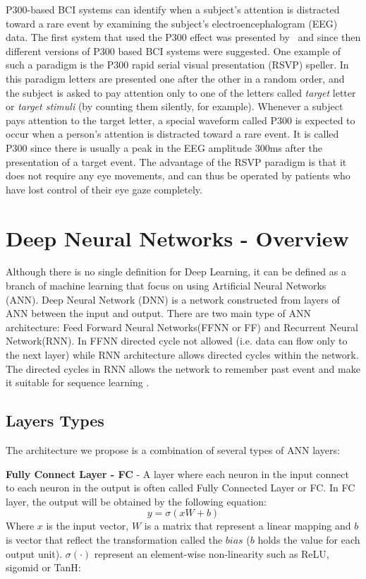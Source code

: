 \documentclass[
12pt, %
english, %
doublespacing, %
headsepline, %
]{MastersDoctoralThesis} %
\begin{document}
P300-based BCI systems can identify when a subject's attention is distracted toward a rare event by examining the subject's electroencephalogram (EEG) data. The first system that used the P300 effect was presented by~\cite{FirstP300} and since then different versions of P300 based BCI systems were suggested. One example of such a paradigm is the P300 rapid serial visual presentation (RSVP) speller. In this paradigm letters are presented one after the other in a random order, and the subject is asked to pay attention only to one of the letters called \textit{target} letter or \textit{target stimuli} (by counting them silently, for example). Whenever a subject pays attention to the target letter, a special waveform called P300 is expected to occur when a person's attention is distracted toward a rare event. It is called P300 since there is usually a peak in the EEG amplitude 300ms after the presentation of a target event. The advantage of the RSVP paradigm is that it does not require any eye movements, and can thus be operated by patients who have lost control of their eye gaze completely.

\section{Deep Neural Networks - Overview}

Although there is no single definition for Deep Learning, it can be defined as a branch of machine learning that focus on using Artificial Neural Networks (ANN). Deep Neural Network (DNN) is a network constructed from layers of ANN between the input and output. There are two main type of ANN architecture: Feed Forward Neural Networks(FFNN or FF) and Recurrent Neural Network(RNN). In FFNN directed cycle not allowed (i.e. data can flow only to the next layer)  while RNN architecture allows directed cycles within the network. The directed cycles in RNN allows the network to remember past event and make it suitable for sequence learning \cite{rumelhart1985learning}.



\subsection{Layers Types}
The architecture we propose is a combination of several types of ANN layers:

\textbf{Fully Connect Layer - FC} - A layer where each neuron in the input connect to each neuron in the output is often called Fully Connected Layer or FC. In FC layer, the output will be obtained by the following equation:
\[y=\sigma \left( {xW + b} \right)\]
Where $x$ is the input vector, $W$ is a matrix that represent a linear mapping and $b$ is vector that reflect the transformation called the $bias$ ($b$ holds the value for each output unit). $\sigma \left( \cdot \right)$ represent an element-wise non-linearity such as ReLU, sigomid or TanH:
\end{document}
